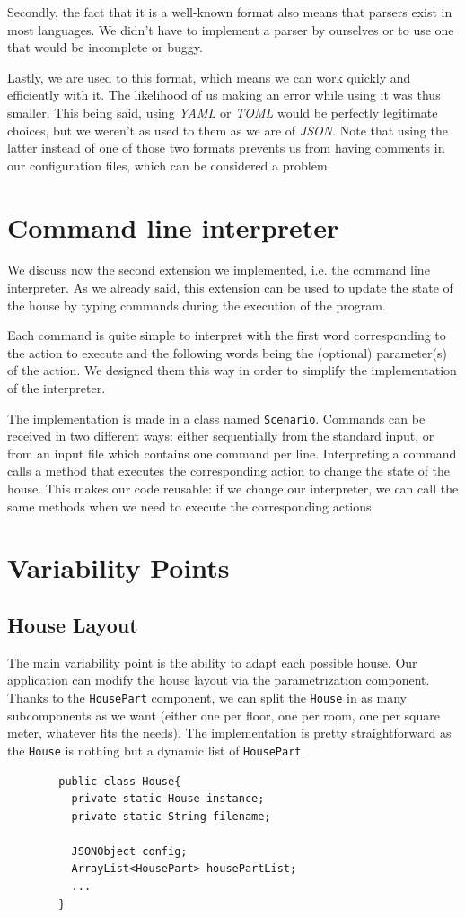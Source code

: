 		Secondly, the fact that it is a well-known format also means that parsers exist in most languages. We didn't have to implement a parser by ourselves or to use one that would be incomplete or buggy.

		Lastly, we are used to this format, which means we can work quickly and efficiently with it. The likelihood of us making an error while using it was thus smaller. This being said, using \textit{YAML} or \textit{TOML} would be perfectly legitimate choices, but we weren't as used to them as we are of \textit{JSON}. Note that using the latter instead of one of those two formats prevents us from having comments in our configuration files, which can be considered a problem.

	\section{Command line interpreter}
		We discuss now the second extension we implemented, i.e. the command line interpreter. As we already said, this extension can be used to update the state of the house by typing commands during the execution of the program.

		Each command is quite simple to interpret with the first word corresponding to the action to execute and the following words being the (optional) parameter(s) of the action. We designed them this way in order to simplify the implementation of the interpreter.

		The implementation is made in a class named \texttt{Scenario}. Commands can be received in two different ways: either sequentially from the standard input, or from an input file which contains one command per line. Interpreting a command calls a method that executes the corresponding action to change the state of the house. This makes our code reusable: if we change our interpreter, we can call the same methods when we need to execute the corresponding actions.

  \section{Variability Points}
    \subsection{House Layout}
      The main variability point is the ability to adapt each possible house. Our application can modify the house layout via the parametrization component. Thanks to the \texttt{HousePart} component, we can split the \texttt{House} in as many subcomponents as we want (either one per floor, one per room, one per square meter, whatever fits the needs). The implementation is pretty straightforward as the \texttt{House} is nothing but a dynamic list of \texttt{HousePart}.
      \begin{verbatim}
        public class House{
          private static House instance;
          private static String filename;

          JSONObject config;
          ArrayList<HousePart> housePartList;
          ...
        }
      \end{verbatim}

